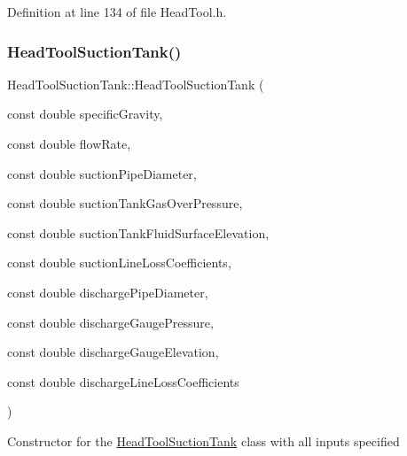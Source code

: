 Definition at line 134 of file Head\+Tool.\+h.

\mbox{\label{class_head_tool_suction_tank_a96579ecd414c723362db00cfeb24cd46}} 
\subsubsection{\texorpdfstring{Head\+Tool\+Suction\+Tank()}{HeadToolSuctionTank()}\hspace{0.1cm}{\footnotesize\ttfamily [2/3]}}
{\footnotesize\ttfamily Head\+Tool\+Suction\+Tank\+::\+Head\+Tool\+Suction\+Tank (\begin{DoxyParamCaption}\item[{const double}]{specific\+Gravity,  }\item[{const double}]{flow\+Rate,  }\item[{const double}]{suction\+Pipe\+Diameter,  }\item[{const double}]{suction\+Tank\+Gas\+Over\+Pressure,  }\item[{const double}]{suction\+Tank\+Fluid\+Surface\+Elevation,  }\item[{const double}]{suction\+Line\+Loss\+Coefficients,  }\item[{const double}]{discharge\+Pipe\+Diameter,  }\item[{const double}]{discharge\+Gauge\+Pressure,  }\item[{const double}]{discharge\+Gauge\+Elevation,  }\item[{const double}]{discharge\+Line\+Loss\+Coefficients }\end{DoxyParamCaption})\hspace{0.3cm}{\ttfamily [inline]}}

Constructor for the \hyperlink{class_head_tool_suction_tank}{Head\+Tool\+Suction\+Tank} class with all inputs specified


